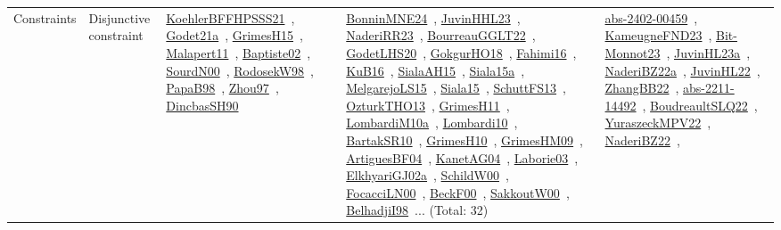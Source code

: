 {\begin{longtable}{lp{3cm}>{\raggedright\arraybackslash}p{6cm}>{\raggedright\arraybackslash}p{6cm}>{\raggedright\arraybackslash}p{8cm}}
Constraints & Disjunctive constraint & \href{../works/KoehlerBFFHPSSS21.pdf}{KoehlerBFFHPSSS21}~\cite{KoehlerBFFHPSSS21}, \href{../works/Godet21a.pdf}{Godet21a}~\cite{Godet21a}, \href{../works/GrimesH15.pdf}{GrimesH15}~\cite{GrimesH15}, \href{../works/Malapert11.pdf}{Malapert11}~\cite{Malapert11}, \href{../works/Baptiste02.pdf}{Baptiste02}~\cite{Baptiste02}, \href{../works/SourdN00.pdf}{SourdN00}~\cite{SourdN00}, \href{../works/RodosekW98.pdf}{RodosekW98}~\cite{RodosekW98}, \href{../works/PapaB98.pdf}{PapaB98}~\cite{PapaB98}, \href{../works/Zhou97.pdf}{Zhou97}~\cite{Zhou97}, \href{../works/DincbasSH90.pdf}{DincbasSH90}~\cite{DincbasSH90} & \href{../works/BonninMNE24.pdf}{BonninMNE24}~\cite{BonninMNE24}, \href{../works/JuvinHHL23.pdf}{JuvinHHL23}~\cite{JuvinHHL23}, \href{../works/NaderiRR23.pdf}{NaderiRR23}~\cite{NaderiRR23}, \href{../works/BourreauGGLT22.pdf}{BourreauGGLT22}~\cite{BourreauGGLT22}, \href{../works/GodetLHS20.pdf}{GodetLHS20}~\cite{GodetLHS20}, \href{../works/GokgurHO18.pdf}{GokgurHO18}~\cite{GokgurHO18}, \href{../works/Fahimi16.pdf}{Fahimi16}~\cite{Fahimi16}, \href{../works/KuB16.pdf}{KuB16}~\cite{KuB16}, \href{../works/SialaAH15.pdf}{SialaAH15}~\cite{SialaAH15}, \href{../works/Siala15a.pdf}{Siala15a}~\cite{Siala15a}, \href{../works/MelgarejoLS15.pdf}{MelgarejoLS15}~\cite{MelgarejoLS15}, \href{../works/Siala15.pdf}{Siala15}~\cite{Siala15}, \href{../works/SchuttFS13.pdf}{SchuttFS13}~\cite{SchuttFS13}, \href{../works/OzturkTHO13.pdf}{OzturkTHO13}~\cite{OzturkTHO13}, \href{../works/GrimesH11.pdf}{GrimesH11}~\cite{GrimesH11}, \href{../works/LombardiM10a.pdf}{LombardiM10a}~\cite{LombardiM10a}, \href{../works/Lombardi10.pdf}{Lombardi10}~\cite{Lombardi10}, \href{../works/BartakSR10.pdf}{BartakSR10}~\cite{BartakSR10}, \href{../works/GrimesH10.pdf}{GrimesH10}~\cite{GrimesH10}, \href{../works/GrimesHM09.pdf}{GrimesHM09}~\cite{GrimesHM09}, \href{../works/ArtiguesBF04.pdf}{ArtiguesBF04}~\cite{ArtiguesBF04}, \href{../works/KanetAG04.pdf}{KanetAG04}~\cite{KanetAG04}, \href{../works/Laborie03.pdf}{Laborie03}~\cite{Laborie03}, \href{../works/ElkhyariGJ02a.pdf}{ElkhyariGJ02a}~\cite{ElkhyariGJ02a}, \href{../works/SchildW00.pdf}{SchildW00}~\cite{SchildW00}, \href{../works/FocacciLN00.pdf}{FocacciLN00}~\cite{FocacciLN00}, \href{../works/BeckF00.pdf}{BeckF00}~\cite{BeckF00}, \href{../works/SakkoutW00.pdf}{SakkoutW00}~\cite{SakkoutW00}, \href{../works/BelhadjiI98.pdf}{BelhadjiI98}~\cite{BelhadjiI98}... (Total: 32) & \href{../works/abs-2402-00459.pdf}{abs-2402-00459}~\cite{abs-2402-00459}, \href{../works/KameugneFND23.pdf}{KameugneFND23}~\cite{KameugneFND23}, \href{../works/Bit-Monnot23.pdf}{Bit-Monnot23}~\cite{Bit-Monnot23}, \href{../works/JuvinHL23a.pdf}{JuvinHL23a}~\cite{JuvinHL23a}, \href{../works/NaderiBZ22a.pdf}{NaderiBZ22a}~\cite{NaderiBZ22a}, \href{../works/JuvinHL22.pdf}{JuvinHL22}~\cite{JuvinHL22}, \href{../works/ZhangBB22.pdf}{ZhangBB22}~\cite{ZhangBB22}, \href{../works/abs-2211-14492.pdf}{abs-2211-14492}~\cite{abs-2211-14492}, \href{../works/BoudreaultSLQ22.pdf}{BoudreaultSLQ22}~\cite{BoudreaultSLQ22}, \href{../works/YuraszeckMPV22.pdf}{YuraszeckMPV22}~\cite{YuraszeckMPV22}, \href{../works/NaderiBZ22.pdf}{NaderiBZ22}~\cite{NaderiBZ22}, 
\end{longtable}}
